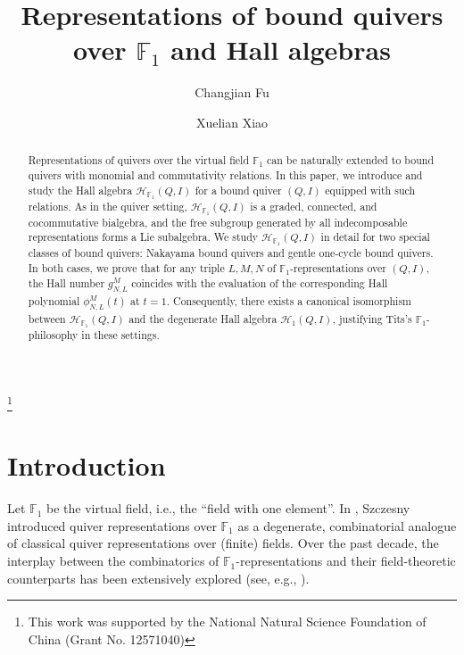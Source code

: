 \documentclass[12pt]{amsart}
\theoremstyle{remark}
\theoremstyle{definition}
\numberwithin{equation}{section}
\begin{document}
\title{ Representations of bound quivers over $\mathbb{F}_1$ and Hall algebras}\thanks{This work was supported by the National Natural Science Foundation of China (Grant No. 12571040)}


\author{Changjian Fu}
\author{Xuelian Xiao}
\address{Department of Mathematics, Sichuan University, Chengdu, 610064 PR China}



\begin{abstract}
    Representations of quivers over the virtual field $\mathbb{F}_1$ can be naturally extended to bound quivers with monomial and commutativity relations. In this paper, we introduce and study the Hall algebra $\mathcal{H}_{\mathbb{F}_1}(Q,I)$ for a bound quiver $(Q,I)$ equipped with such relations. As in the quiver setting, $\mathcal{H}_{\mathbb{F}_1}(Q,I)$ is a graded, connected, and cocommutative bialgebra, and the free subgroup generated by all indecomposable representations forms a Lie subalgebra. We study $\mathcal{H}_{\mathbb{F}_1}(Q,I)$ in detail for two special classes of bound quivers: Nakayama bound quivers and gentle one-cycle bound quivers. In both cases, we prove that for any triple $L, M, N$ of $\mathbb{F}_1$-representations over $(Q,I)$, the Hall number $g_{N,L}^M$ coincides with the evaluation of the corresponding Hall polynomial $\phi_{N,L}^M(t)$ at $t=1$. Consequently, there exists a canonical isomorphism between $\mathcal{H}_{\mathbb{F}_1}(Q,I)$ and the degenerate Hall algebra $\mathcal{H}_1(Q,I)$, justifying Tits's $\mathbb{F}_1$-philosophy in these settings.
\end{abstract}
\maketitle


\section{Introduction}

Let $\mathbb{F}_1$ be the virtual field, i.e., the ``field with one element''.
In \cite{Sz12}, Szczesny introduced quiver representations over $\mathbb{F}_1$ as a degenerate, combinatorial analogue of classical quiver representations over (finite) fields.  Over the past decade, the interplay between the combinatorics of $\mathbb{F}_1$-representations and their field-theoretic counterparts has been extensively explored (see, e.g., \cite{JKS23,JS23,JS24,Kleinau25}). 
\end{document}

